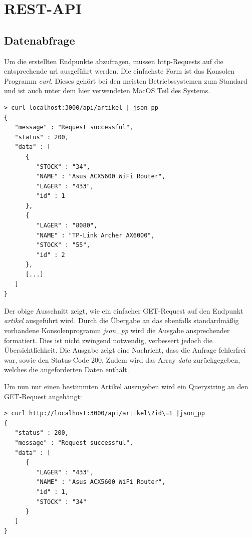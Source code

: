 \newpage
\section{REST-API}
\label{sec:rest}

\subsection{Datenabfrage}

Um die erstellten Endpunkte abzufragen, müssen \gls{http}-Requests auf die entsprechende \gls{url} ausgeführt werden. Die einfachste Form ist das Konsolen Programm \textit{curl}. Dieses gehört bei den meisten Betriebssystemen zum Standard und ist auch unter dem hier verwendeten MacOS Teil des Systems. \cite{DanielStenbergandContributers.2020}

\begin{verbatim}
> curl localhost:3000/api/artikel | json_pp
{
   "message" : "Request successful",
   "status" : 200,
   "data" : [
      {
         "STOCK" : "34",
         "NAME" : "Asus ACX5600 WiFi Router",
         "LAGER" : "433",
         "id" : 1
      },
      {
         "LAGER" : "8080",
         "NAME" : "TP-Link Archer AX6000",
         "STOCK" : "55",
         "id" : 2
      },
      [...]
   ]
}
\end{verbatim}

Der obige Ausschnitt zeigt, wie ein einfacher GET-Request auf den Endpunkt \textit{artikel} ausgeführt wird.
Durch die Übergabe an das ebenfalls standardmäßig vorhandene Konsolenprogramm \textit{json\_pp} wird die Ausgabe ansprechender formatiert. Dies ist nicht zwingend notwendig, verbessert jedoch die Übersichtlichkeit. Die Ausgabe zeigt eine Nachricht, dass die Anfrage fehlerfrei war, sowie den Status-Code 200. Zudem wird das Array \textit{data} zurückgegeben, welches die angeforderten Daten enthält.

Um nun nur einen bestimmten Artikel auszugeben wird ein Querystring an den GET-Request angehängt:
\begin{verbatim}
> curl http://localhost:3000/api/artikel\?id\=1 |json_pp                                                                                                                                       
{
   "status" : 200,
   "message" : "Request successful",
   "data" : [
      {
         "LAGER" : "433",
         "NAME" : "Asus ACX5600 WiFi Router",
         "id" : 1,
         "STOCK" : "34"
      }
   ]
}
\end{verbatim}

